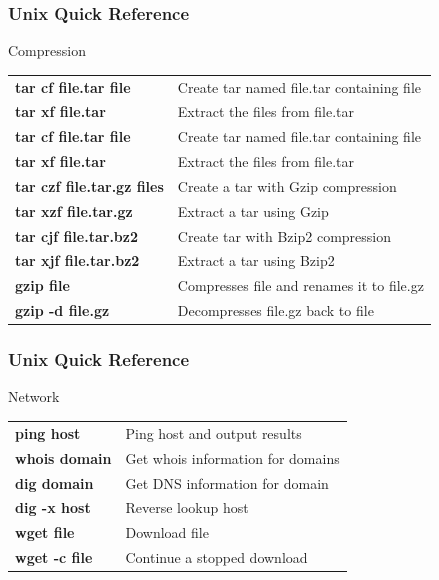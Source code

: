 \documentclass[10pt, hyperref={unicode=true,pdfusetitle, bookmarks=true,bookmarksnumbered=false,bookmarksopen=false, breaklinks=false,pdfborder={0 0l 1},backref=true,colorlinks=true,linkcolor=darkblue,pageanchor}]{beamer}
\begin{document}
\begin{frame}
\frametitle{Unix Quick Reference}

\begin{block}{Compression}
\begin{tabular}{ll}
\textbf{tar cf file.tar file}           & Create tar named file.tar containing file     \tabularnewline
\textbf{tar xf file.tar}                & Extract the files from file.tar               \tabularnewline
\textbf{tar cf file.tar file}           & Create tar named file.tar containing file     \tabularnewline
\textbf{tar xf file.tar}                & Extract the files from file.tar               \tabularnewline
\textbf{tar czf file.tar.gz files}      & Create a tar with Gzip compression            \tabularnewline
\textbf{tar xzf file.tar.gz}            & Extract a tar using Gzip                      \tabularnewline
\textbf{tar cjf file.tar.bz2}           & Create tar with Bzip2 compression             \tabularnewline
\textbf{tar xjf file.tar.bz2}           & Extract a tar using Bzip2                     \tabularnewline
\textbf{gzip file}                      & Compresses file and renames it to file.gz     \tabularnewline
\textbf{gzip -d file.gz}                & Decompresses file.gz back to file             \tabularnewline
\end{tabular}
\end{block}

\end{frame}
\begin{frame}
\frametitle{Unix Quick Reference}
\begin{block}{Network}

\begin{tabular}{ll}
\textbf{ping host}      & Ping host and output results                  \tabularnewline
\textbf{whois domain}   & Get whois information for domains             \tabularnewline
\textbf{dig domain}     & Get DNS information for domain                \tabularnewline
\textbf{dig -x host}    & Reverse lookup host                           \tabularnewline
\textbf{wget file}      & Download file                                 \tabularnewline
\textbf{wget -c file}   & Continue a stopped download                   \tabularnewline
\end{tabular}

\end{block}
\end{frame}
\end{document}
